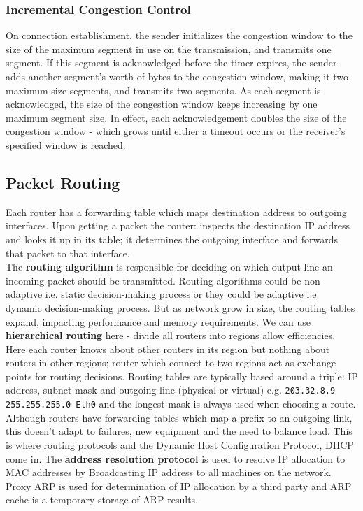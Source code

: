 \documentclass[twoside]{article}
\begin{document}
\subsubsection{Incremental Congestion Control}
On connection establishment, the sender initializes the congestion window to
the size of the maximum segment in use on the transmission, and transmits one
segment. If this segment is acknowledged before the timer expires, the sender
adds another segment's worth of bytes to the congestion window, making it two
maximum size segments, and transmits two segments. As each segment is acknowledged,
the size of the congestion window keeps increasing by one maximum segment size.
In effect, each acknowledgement doubles the size of the congestion window - 
which grows until either a timeout occurs or the receiver's specified window
is reached.
\subsection{Packet Routing}
Each router has a forwarding table which maps destination address to outgoing
interfaces. Upon getting a packet the router: inspects the destination IP
address and looks it up in its table; it determines the outgoing interface and
forwards that packet to that interface. \\

The \textbf{routing algorithm} is responsible for deciding on which output line
an incoming packet should be transmitted. Routing algorithms could be 
non-adaptive i.e. static decision-making process or they could be adaptive i.e.
dynamic decision-making process. But as network grow in size, the routing tables
expand, impacting performance and memory requirements. We can use \textbf{hierarchical 
routing} here - divide all routers into regions allow efficiencies. Here each 
router knows about other routers in its region but nothing about routers in other
regions; router which connect to two regions act as exchange points for routing 
decisions. Routing tables are typically based around a triple: IP address, 
subnet mask and outgoing line (physical or virtual) e.g. \texttt{203.32.8.9 
255.255.255.0 Eth0} and the longest mask is always used when choosing a route.
Although routers have forwarding tables which map a prefix to an outgoing link,
this doesn't adapt to failures, new equipment and the need to balance load. This
is where routing protocols and the Dynamic Host Configuration Protocol, DHCP 
come in. The \textbf{address resolution protocol} is used to resolve IP allocation
to MAC addresses by Broadcasting IP address to all machines on the network. Proxy
ARP is used for determination of IP allocation by a third party and ARP cache 
is a temporary storage of ARP results.
\end{document}
